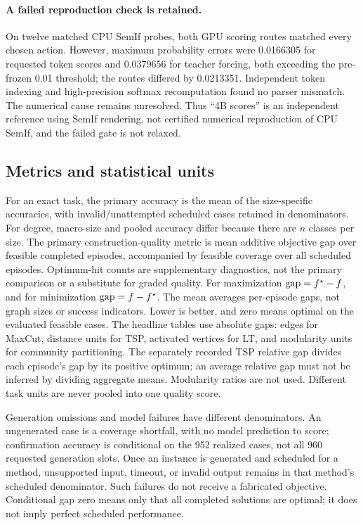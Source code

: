 \paragraph{A failed reproduction check is retained.}
On twelve matched CPU SemIf probes, both GPU scoring routes matched every
chosen action. However, maximum probability errors were 0.0166305 for requested
token scores and 0.0379656 for teacher forcing, both exceeding the pre-frozen
0.01 threshold; the routes differed by 0.0213351. Independent token indexing
and high-precision softmax recomputation found no parser mismatch. The
numerical cause remains unresolved. Thus ``4B scores'' is an independent
reference using SemIf rendering, not certified numerical reproduction of
CPU SemIf, and the failed gate is not relaxed.

\subsection{Metrics and statistical units}
For an exact task, the primary accuracy is the mean of the size-specific
accuracies, with invalid/unattempted scheduled cases retained in denominators.
For degree, macro-size and pooled accuracy differ because there are $n$
classes per size. The primary construction-quality metric is mean additive
objective gap over feasible completed episodes, accompanied by feasible
coverage over all scheduled episodes. Optimum-hit counts are supplementary
diagnostics, not the primary comparison or a substitute for graded quality.
For maximization $\operatorname{gap}=f^\star-f$, and for minimization $\operatorname{gap}=f-f^\star$.
The mean averages per-episode gaps, not graph sizes or success indicators.
Lower is better, and zero means optimal on the evaluated feasible cases.
The headline tables use absolute gaps: edges for MaxCut, distance units for
TSP, activated vertices for LT, and modularity units for community partitioning.
The separately recorded TSP relative gap divides each episode's gap by its
positive optimum; an average relative gap must not be inferred by dividing
aggregate means. Modularity ratios are not used. Different task units are
never pooled into one quality score.

Generation omissions and model failures have different denominators.
An ungenerated case is a coverage shortfall, with no model prediction to
score; confirmation accuracy is conditional on the 952 realized cases,
not all 960 requested generation slots. Once an instance is generated and
scheduled for a method, unsupported input, timeout, or invalid output remains
in that method's scheduled denominator. Such failures do not receive a
fabricated objective. Conditional gap zero means only that all completed
solutions are optimal; it does not imply perfect scheduled performance.

